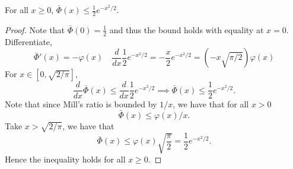 \documentclass[12pt, reqno]{amsart}
\numberwithin{equation}{section}
\begin{document}
\begin{refsection}
\begin{appendices}
\begin{lemma}
\label{lemma:millsratio}
For all $x \ge 0$, $\bar\Phi(x) \le \frac{1}{2} e^{-x^2/2}$. 
\end{lemma}
\begin{proof}
Note that $\bar\Phi(0) = \frac{1}{2}$ and thus the bound holds with equality at $x=0$.
Differentiate, \[
\bar \Phi'(x) = -\varphi(x) \quad \frac{d}{dx} \frac{1}{2} e^{-x^2/2} = -\frac{x}{2} e^
{-x^2/2} = (-x \sqrt{\pi/2}) \varphi(x)
\]
For $x \in [0, \sqrt{2/\pi}]$, \[
\frac{d}{dx}\bar\Phi(x) \le \frac{d}{dx} \frac{1}{2} e^{-x^2/2} \implies \bar\Phi(x) \le 
\frac{1}{2} e^{-x^2/2}. 
\]
Note that since Mill's ratio is bounded by $1/x$, we have that for all $x > 0$ \[
\bar\Phi(x) \le \varphi(x)/x.
\]
Take $x > \sqrt{2/\pi}$, we have that\[
\bar \Phi(x) \le \varphi(x) \sqrt{\frac{\pi}{2}} = \frac{1}{2} e^{-x^2/2}.
\]
Hence the inequality holds for all $ x \ge 0 $.
\end{proof}

\end{appendices}


\printbibliography
\end{refsection}
\end{document}
